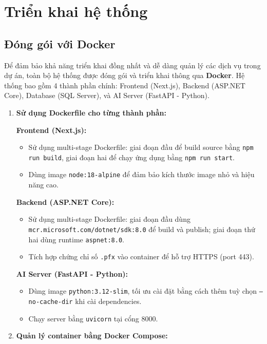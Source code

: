 \section{Triển khai hệ thống}
\subsection{Đóng gói với Docker}
\noindent Để đảm bảo khả năng triển khai đồng nhất và dễ dàng quản lý các dịch vụ trong dự án, toàn bộ hệ thống được đóng gói và triển khai thông qua \textbf{Docker}. Hệ thống bao gồm 4 thành phần chính: Frontend (Next.js), Backend (ASP.NET Core), Database (SQL Server), và AI Server (FastAPI - Python).

\begin{enumerate}
    \item \textbf{Sử dụng Dockerfile cho từng thành phần:}
    
    \textbf{Frontend (Next.js):}
    \begin{itemize}[label=--]
        \item Sử dụng multi-stage Dockerfile: giai đoạn đầu để build source bằng \texttt{npm run build}, giai đoạn hai để chạy ứng dụng bằng \texttt{npm run start}.
        \item Dùng image \texttt{node:18-alpine} để đảm bảo kích thước image nhỏ và hiệu năng cao.
    \end{itemize}
    
    \textbf{Backend (ASP.NET Core):}
    \begin{itemize}[label=--]
        \item Sử dụng multi-stage Dockerfile: giai đoạn đầu dùng \texttt{mcr.microsoft.com/dotnet/sdk:8.0} để build và publish; giai đoạn thứ hai dùng runtime \texttt{aspnet:8.0}.
        \item Tích hợp chứng chỉ số \texttt{.pfx} vào container để hỗ trợ HTTPS (port 443).
    \end{itemize}
    
    \textbf{AI Server (FastAPI - Python):}
    \begin{itemize}[label=--]
        \item Dùng image \texttt{python:3.12-slim}, tối ưu cài đặt bằng cách thêm tuỳ chọn \texttt{--no-cache-dir} khi cài dependencies.
        \item Chạy server bằng \texttt{uvicorn} tại cổng 8000.
    \end{itemize}
    
    \item \textbf{Quản lý container bằng Docker Compose:}
    

\end{enumerate}
